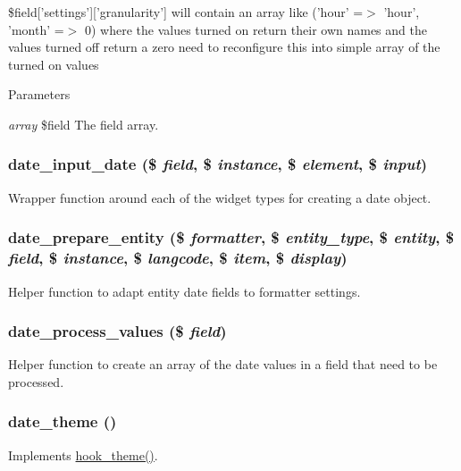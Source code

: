 \$field\mbox{[}'settings'\mbox{]}\mbox{[}'granularity'\mbox{]} will contain an array like ('hour' =$>$ 'hour', 'month' =$>$ 0) where the values turned on return their own names and the values turned off return a zero need to reconfigure this into simple array of the turned on values


\begin{DoxyParams}{Parameters}
\item[{\em array}]\$field The field array. \end{DoxyParams}
\hypertarget{date_8module_a7b44720b330f4318eb971537b64a27ad}{
\subsubsection[{date\_\-input\_\-date}]{\setlength{\rightskip}{0pt plus 5cm}date\_\-input\_\-date (\$ {\em field}, \/  \$ {\em instance}, \/  \$ {\em element}, \/  \$ {\em input})}}
\label{date_8module_a7b44720b330f4318eb971537b64a27ad}
Wrapper function around each of the widget types for creating a date object. \hypertarget{date_8module_a39cd033956c5dc51331bad9eb2cebd81}{
\subsubsection[{date\_\-prepare\_\-entity}]{\setlength{\rightskip}{0pt plus 5cm}date\_\-prepare\_\-entity (\$ {\em formatter}, \/  \$ {\em entity\_\-type}, \/  \$ {\em entity}, \/  \$ {\em field}, \/  \$ {\em instance}, \/  \$ {\em langcode}, \/  \$ {\em item}, \/  \$ {\em display})}}
\label{date_8module_a39cd033956c5dc51331bad9eb2cebd81}
Helper function to adapt entity date fields to formatter settings. \hypertarget{date_8module_a32f61cf4fd59beedd48c7a7be04c1693}{
\subsubsection[{date\_\-process\_\-values}]{\setlength{\rightskip}{0pt plus 5cm}date\_\-process\_\-values (\$ {\em field})}}
\label{date_8module_a32f61cf4fd59beedd48c7a7be04c1693}
Helper function to create an array of the date values in a field that need to be processed. \hypertarget{date_8module_a9f95819df33aab94d18f4461985d1028}{
\subsubsection[{date\_\-theme}]{\setlength{\rightskip}{0pt plus 5cm}date\_\-theme ()}}
\label{date_8module_a9f95819df33aab94d18f4461985d1028}
Implements \hyperlink{group__hooks_ga013ccb45c7aaab1c16cf9691428c910d}{hook\_\-theme()}. 